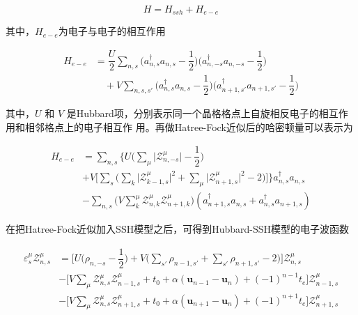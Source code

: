 \documentclass[12pt,]{report}
\begin{document}
\begin{equation}
H = H_{ssh} + H_{e-e}
\end{equation}

\noindent
其中，\(H_{e-e}\)为电子与电子的相互作用

\begin{equation}
\begin{split}
H_{e-e} &= \dfrac{U}{2} \sum\limits_{n,s} \Big( a_{n,s}^\dagger a_{n,s} -
\dfrac{1}{2} \Big)\Big( a_{n,-s}^\dagger a_{n,-s} - \dfrac{1}{2} \Big) \\
&\quad + V \sum\limits_{n,s,s'} \Big( a_{n,s}^\dagger a_{n,s} - \dfrac{1}{2}
\Big)\Big( a_{n+1,s'}^\dagger a_{n+1,s'} - \dfrac{1}{2} \Big) 
\end{split}
\end{equation}

\noindent
其中，\(U\) 和 \(V\)
是Hubbard项，分别表示同一个晶格格点上自旋相反电子的相互作用和相邻格点上的电子相互作
用。再做Hatree-Fock近似后的哈密顿量可以表示为

\begin{equation}
\begin{aligned}
H_{e-e} &= \sum\limits_{n,s}\Big\{U\Big( \sum\limits_{\mu} \Big|
\mathcal{Z}_{n,-s}^{\mu} \Big| - \dfrac{1}{2} \Big) \\
&+ V\Big[ \sum\limits_s \Big(
\sum\limits_k \Big| \mathcal{Z}_{k-1,s}^{\mu} \Big|^2 + \sum\limits_{\mu} \Big|
\mathcal{Z}_{n+1,s}^{\mu} \Big|^2 - 2\Big) \Big] \Big\} a_{n,s}^\dagger a_{n,s}\\
&- \sum\limits_{n,s} \Big( V \sum\limits_{k}^{\mu} \mathcal{Z}_{n,k}^{\mu}
\mathcal{Z}_{n+1,k}^{\mu} \Big) (a_{n+1,s}^\dagger a_{n,s} + a_{n,s}^\dagger
a_{n+1,s}) 
\end{aligned}
\end{equation}

\noindent
在把Hatree-Fock近似加入SSH模型之后，可得到Hubbard-SSH模型的电子波函数

\begin{equation}
\begin{aligned}
\varepsilon_s^\mu \mathcal{Z}_{n,s}^\mu &= \Big[ U \Big( \rho_{n,-s} - \dfrac{1}{2} 
\Big) + V \Big(\sum\limits_{s'} \rho_{n-1, s'} + \sum\limits_{s'} \rho_{n+1,s'} -
2\Big) \Big]\mathcal{Z}_{n,s}^{\mu} \\
&- \Big[ V \sum\limits_{\mu} \mathcal{Z}_{n,s}^{\mu} \mathcal{Z}_{n-1,s}^{\mu} 
+ t_0 + \alpha (\bm{u}_{n-1} - \bm{u}_n) + (-1)^{n-1} t_e
  \Big]\mathcal{Z}_{n-1,s}^\mu \\
&- \Big[ V \sum\limits_{\mu} \mathcal{Z}_{n,s}^{\mu} \mathcal{Z}_{n+1,s}^{\mu} + t_0
+ \alpha (\bm{u}_{n+1} - \bm{u}_n) + (-1)^{n+1} t_e \Big] \mathcal{Z}_{n+1,s}^{\mu}
\end{aligned}
\end{equation}
\end{document}
